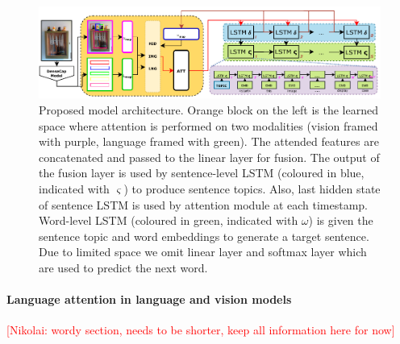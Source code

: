 \documentclass[11pt,a4paper]{article}
\newcommand{\kibitz}[2]{\ifnum\Comments=1\textcolor{#1}{#2}\fi}
\newcommand{\nikolai}[1]{\kibitz{red}      {[Nikolai: #1]}}
\begin{document}
\begin{figure}[h!]
  \includegraphics[width=\linewidth]{figures/model}
  \caption{Proposed model architecture.
  		Orange block on the left is the learned space where attention is performed on two modalities (vision framed with purple, language framed with green).
		The attended features are concatenated and passed to the linear layer for fusion.
		The output of the fusion layer is used by sentence-level LSTM (coloured in blue, indicated with $\varsigma$) to produce sentence topics.
		Also, last hidden state of sentence LSTM is used by attention module at each timestamp.
		Word-level LSTM (coloured in green, indicated with $\omega$) is given the sentence topic and word embeddings to generate a target sentence.
		Due to limited space we omit linear layer and softmax layer which are used to predict the next word.}
  \label{fig:model}
\end{figure}

\paragraph{Language attention in language and vision models}
\nikolai{wordy section, needs to be shorter, keep all information here for now}
\end{document}

